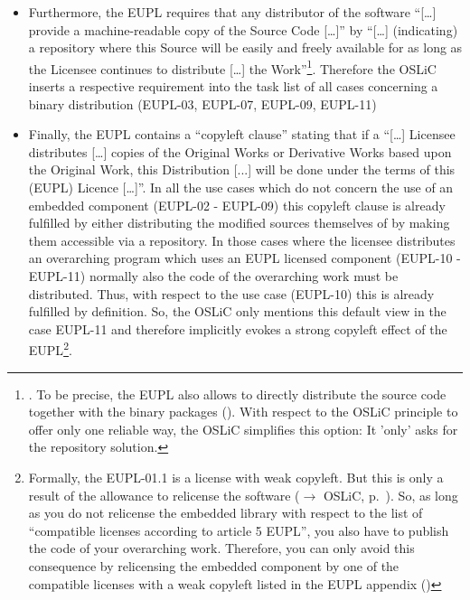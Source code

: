 \begin{itemize}
  \item Furthermore, the EUPL requires that any distributor of the software
  \enquote{[\ldots] provide a machine-readable copy of the Source Code [\ldots]}
  by \enquote{[\ldots] (indicating) a repository where this Source will be
  easily and freely available for as long as the Licensee continues to
  distribute [\ldots] the Work}\footnote{\cite[cf.][\nopage wp.\
  §5]{EuplLicense2007en}. To be precise, the EUPL also allows to directly
  distribute the source code together with the binary packages
  (\cite[cf.][\nopage wp.\ §3]{EuplLicense2007en}). With respect to the OSLiC
  principle to offer only one reliable way, the OSLiC simplifies this option:
  It 'only' asks for the repository solution.}. Therefore the OSLiC inserts a
  respective requirement into the task list of all cases concerning a binary
  distribution  (EUPL-03, EUPL-07, EUPL-09, EUPL-11)
  
  \item Finally, the EUPL contains a \enquote{copyleft clause} stating that if a
  \enquote{[\ldots] Licensee distributes [\ldots] copies of the Original Works
  or Derivative Works based upon the Original Work, this Distribution [...] will
  be done under the terms of this (EUPL) Licence [\ldots]}. In all the use cases
  which do not concern the use of an embedded component (EUPL-02 - EUPL-09) this
  copyleft clause is already fulfilled by either distributing the modified
  sources themselves of by making them accessible via a repository. In those
  cases where the licensee distributes an overarching program which uses an EUPL
  licensed component (EUPL-10 - EUPL-11) normally also the code of the overarching
  work must be distributed. Thus, with respect to the use case (EUPL-10) this is
  already fulfilled by definition. So, the OSLiC only mentions this default view
  in the case EUPL-11 and therefore implicitly evokes a strong copyleft effect of
  the EUPL\footnote{Formally, the EUPL-01.1 is a license with weak copyleft. But
  this is only a result of the allowance to relicense the software
  ($\rightarrow$ OSLiC, p.\ \pageref{sec:ProtectingPowerOfEupl}). So, as long as
  you do not relicense the embedded library with respect to the list of
  \enquote{compatible licenses according to article 5 EUPL}, you also have to
  publish the code of your overarching work. Therefore, you can only avoid this
  consequence by relicensing the embedded component by one of the compatible
  licenses with a weak copyleft listed in the EUPL appendix (\cite[cf.][\nopage
  wp §5 and Appendix]{EuplLicense2007en})}.
  

\end{itemize}








%
